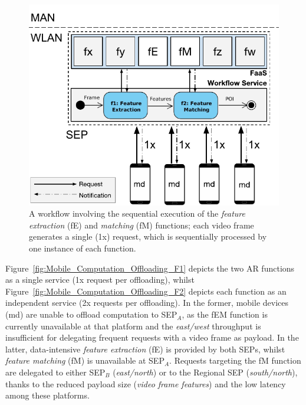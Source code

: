 \begin{figure}[bp]
	\centering
	\includegraphics[width=1\linewidth]{Figs/Mobile_Computation_Offloading_Workflow.pdf}
	\caption{A workflow involving the sequential execution of the \textit{feature extraction} (fE) and \textit{matching} (fM) functions; each video frame generates a single (1x) request, which is sequentially processed by one instance of each function.} 
	\label{fig:Mobile_Computation_Offloading_Workflow}
\end{figure}

Figure~\ref{fig:Mobile_Computation_Offloading_F1} depicts the two AR functions as a single service (1x request per offloading), whilst Figure~\ref{fig:Mobile_Computation_Offloading_F2} depicts each function as an independent service (2x requests per offloading). In the former, mobile devices (md) are unable to offload computation to SEP$_A$, as the fEM function is currently unavailable at that platform and the \textit{east/west} throughput is insufficient for delegating frequent requests with a video frame as payload. In the latter, data-intensive \textit{feature extraction} (fE) is provided by both SEPs, whilst \textit{feature matching} (fM) is unavailable at SEP$_A$. Requests targeting the fM function are delegated
to either SEP$_B$ (\textit{east/north}) or 
to the Regional SEP (\textit{south/north}),
thanks to the reduced payload size (\textit{video frame features}) and the low latency among these platforms. 

